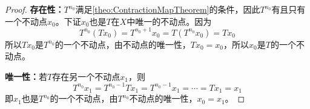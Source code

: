 \begin{proof}
	\textbf{存在性：}$T^{n_0}$满足\cref{theo:ContractionMapTheorem}的条件，因此$T^{n_0}$有且只有一个不动点$x_0$。下证$x_0$也是$T$在$X$中唯一的不动点。因为
	\begin{equation*}
		T^{n_0}(Tx_0)=T^{n_0+1}x_0=T(T^{n_0}x_0)=Tx_0
	\end{equation*}
	所以$Tx_0$是$T^{n_0}$的一个不动点，由不动点的唯一性，$Tx_0=x_0$，所以$x_0$是$T$的一个不动点。\par
	\textbf{唯一性：}若$T$存在另一个不动点$x_1$，则
	\begin{equation*}
		T^{n_0}x_1=T^{n_0-1}Tx_1=T^{n_0-1}x_1=\cdots=Tx_1=x_1
	\end{equation*}
	即$x_1$也是$T^{n_0}$的一个不动点，由$T^{n_0}$不动点的唯一性，$x_0=x_1$。
\end{proof}
